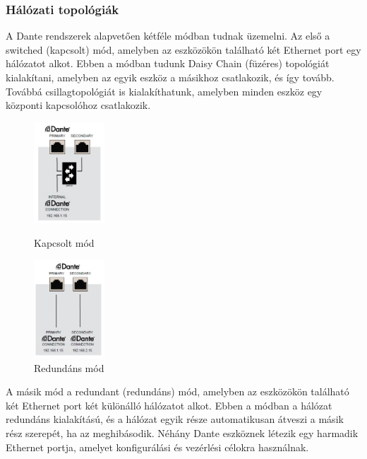 \subsubsection{Hálózati topológiák}
A Dante rendszerek alapvetően kétféle módban tudnak üzemelni. Az első a
switched (kapcsolt) mód, amelyben az eszközökön található két Ethernet port
egy hálózatot alkot. Ebben a módban tudunk Daisy Chain (füzéres) topológiát kialakítani,
amelyben az egyik eszköz a másikhoz csatlakozik, és így tovább. Továbbá csillagtopológiát
is kialakíthatunk, amelyben minden eszköz egy központi kapcsolóhoz csatlakozik.
\begin{figure}[H]
	\begin{minipage}{0.5\textwidth}
		\centering
		\includegraphics[width=100px, keepaspectratio]{figures/dante-switched-mode.jpg}
		\caption{Kapcsolt mód}
		\label{fig:dante_switched}
	\end{minipage}%
	\begin{minipage}{0.5\textwidth}
		\centering
		\includegraphics[width=100px, keepaspectratio]{figures/dante-redundant-mode.jpg}
		\caption{Redundáns mód}
		\label{fig:dante_redundant}
	\end{minipage}
\end{figure}

A másik mód a redundant (redundáns) mód, amelyben az eszközökön található két
Ethernet port két különálló hálózatot alkot. Ebben a módban a hálózat redundáns
kialakítású, és a hálózat egyik része automatikusan átveszi a másik rész szerepét,
ha az meghibásodik.
Néhány Dante eszköznek létezik egy harmadik Ethernet portja, amelyet konfigurálási
és vezérlési célokra használnak.
